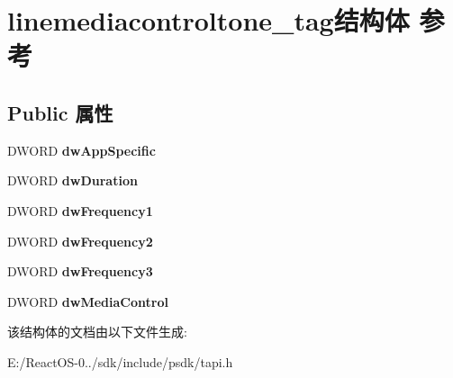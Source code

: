 \hypertarget{structlinemediacontroltone__tag}{}\section{linemediacontroltone\+\_\+tag结构体 参考}
\label{structlinemediacontroltone__tag}
\subsection*{Public 属性}
\begin{DoxyCompactItemize}
\item 
\mbox{\label{structlinemediacontroltone__tag_a3e0b048961aa23f4fa98534d37261434}} 
D\+W\+O\+RD {\bfseries dw\+App\+Specific}
\item 
\mbox{\label{structlinemediacontroltone__tag_a308cdc28fccfa53d3bf6fd1d6a067aa1}} 
D\+W\+O\+RD {\bfseries dw\+Duration}
\item 
\mbox{\label{structlinemediacontroltone__tag_ad117c72f0b31d90224ec5d06fbe5b647}} 
D\+W\+O\+RD {\bfseries dw\+Frequency1}
\item 
\mbox{\label{structlinemediacontroltone__tag_a9ff9364ed8a6a4da9dac9f0d9aa9ed98}} 
D\+W\+O\+RD {\bfseries dw\+Frequency2}
\item 
\mbox{\label{structlinemediacontroltone__tag_a595818878ee87b06ad585effb0d7e589}} 
D\+W\+O\+RD {\bfseries dw\+Frequency3}
\item 
\mbox{\label{structlinemediacontroltone__tag_affa6caa53a97b016fde9d831b7f4fec0}} 
D\+W\+O\+RD {\bfseries dw\+Media\+Control}
\end{DoxyCompactItemize}


该结构体的文档由以下文件生成\+:\begin{DoxyCompactItemize}
\item 
E\+:/\+React\+O\+S-\/0../sdk/include/psdk/tapi.\+h\end{DoxyCompactItemize}
